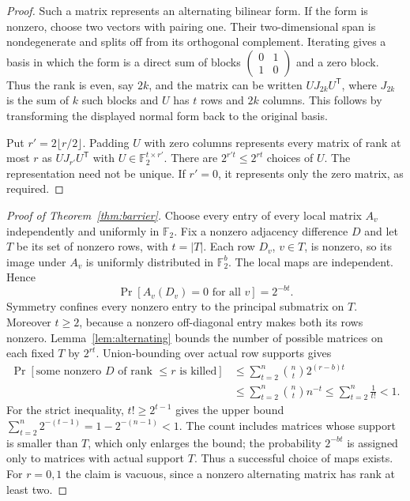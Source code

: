 \documentclass[11pt]{article}
\theoremstyle{remark}
\newcommand{\F}{\mathbb F_2}
\begin{document}
\begin{proof}
Such a matrix represents an alternating bilinear form. If the form is
nonzero, choose two vectors with pairing one. Their two-dimensional span
is nondegenerate and splits off from its orthogonal complement. Iterating
gives a basis in which the form is a direct sum of blocks
$\left(\begin{smallmatrix}0&1\\1&0\end{smallmatrix}\right)$ and a zero
block. Thus the rank is even, say $2k$, and the matrix can be written
$U J_{2k}U^{\mathsf T}$, where $J_{2k}$ is the sum of $k$ such blocks
and $U$ has $t$ rows and $2k$ columns. This follows by transforming the
displayed normal form back to the original basis.

Put $r'=2\lfloor r/2\rfloor$. Padding $U$ with zero columns represents
every matrix of rank at most $r$ as $U J_{r'}U^{\mathsf T}$ with
$U\in\F^{t\times r'}$. There are $2^{r't}\le2^{rt}$ choices of $U$.
The representation need not be unique. If $r'=0$, it represents only
the zero matrix, as required.
\end{proof}

\begin{proof}[Proof of Theorem~\ref{thm:barrier}]
Choose every entry of every local matrix $A_v$ independently and
uniformly in $\F$. Fix a nonzero adjacency difference $D$ and let $T$
be its set of nonzero rows, with $t=|T|$. Each row $D_v$, $v\in T$,
is nonzero, so its image under $A_v$ is uniformly distributed in $\F^b$.
The local maps are independent. Hence
\[
 \Pr[A_v(D_v)=0\text{ for all }v]=2^{-bt}.
\]
Symmetry confines every nonzero entry to the principal submatrix on $T$.
Moreover $t\ge2$, because a nonzero off-diagonal entry makes both its
rows nonzero. Lemma~\ref{lem:alternating} bounds the number of possible
matrices on each fixed $T$ by $2^{rt}$. Union-bounding over actual row
supports gives
\begin{align*}
 \Pr[\text{some nonzero }D\text{ of rank }\le r\text{ is killed}]
 &\le\sum_{t=2}^n\binom nt2^{(r-b)t}\\
 &\le\sum_{t=2}^n\binom nt n^{-t}
 \le\sum_{t=2}^n\frac1{t!}<1.
\end{align*}
For the strict inequality, $t!\ge2^{t-1}$ gives the upper bound
$\sum_{t=2}^n2^{-(t-1)}=1-2^{-(n-1)}<1$.
The count includes matrices whose support is smaller than $T$, which
only enlarges the bound; the probability $2^{-bt}$ is assigned only
to matrices with actual support $T$. Thus a successful choice of maps
exists. For $r=0,1$ the claim is vacuous, since a nonzero alternating
matrix has rank at least two.
\end{proof}
\end{document}
